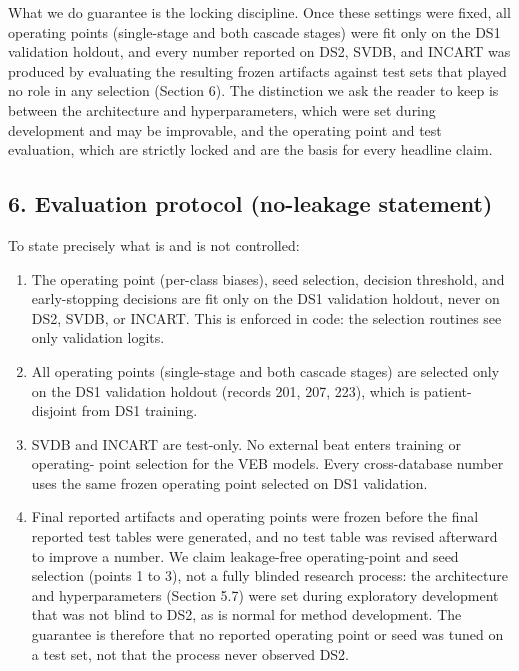 \documentclass[
]{article}
\providecommand{\tightlist}{%
  \setlength{\itemsep}{0pt}\setlength{\parskip}{0pt}}
\begin{document}
What we do guarantee is the locking discipline. Once these settings were
fixed, all operating points (single-stage and both cascade stages) were
fit only on the DS1 validation holdout, and every number reported on
DS2, SVDB, and INCART was produced by evaluating the resulting frozen
artifacts against test sets that played no role in any selection
(Section 6). The distinction we ask the reader to keep is between the
architecture and hyperparameters, which were set during development and
may be improvable, and the operating point and test evaluation, which
are strictly locked and are the basis for every headline claim.

\subsection{6. Evaluation protocol (no-leakage
statement)}\label{evaluation-protocol-no-leakage-statement}

To state precisely what is and is not controlled:

\begin{enumerate}
\def\labelenumi{\arabic{enumi}.}
\tightlist
\item
  The operating point (per-class biases), seed selection, decision
  threshold, and early-stopping decisions are fit only on the DS1
  validation holdout, never on DS2, SVDB, or INCART. This is enforced in
  code: the selection routines see only validation logits.
\item
  All operating points (single-stage and both cascade stages) are
  selected only on the DS1 validation holdout (records 201, 207, 223),
  which is patient-disjoint from DS1 training.
\item
  SVDB and INCART are test-only. No external beat enters training or
  operating- point selection for the VEB models. Every cross-database
  number uses the same frozen operating point selected on DS1
  validation.
\item
  Final reported artifacts and operating points were frozen before the
  final reported test tables were generated, and no test table was
  revised afterward to improve a number. We claim leakage-free
  operating-point and seed selection (points 1 to 3), not a fully
  blinded research process: the architecture and hyperparameters
  (Section 5.7) were set during exploratory development that was not
  blind to DS2, as is normal for method development. The guarantee is
  therefore that no reported operating point or seed was tuned on a test
  set, not that the process never observed DS2.
\end{enumerate}
\end{document}
